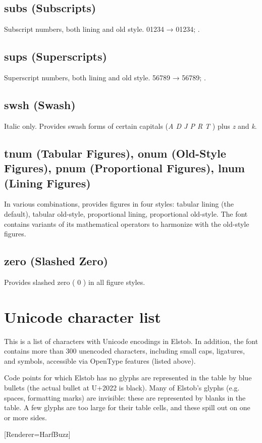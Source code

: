 \documentclass[12pt,letterpaper,openany]{book}
\begin{document}
\section{subs (Subscripts)}
Subscript numbers, both lining and old style. 01234 →
{ 01234};
.

\section{sups (Superscripts)}
Superscript numbers, both lining and old style. 56789 →
{ 56789};
.

\section{swsh (Swash)}
Italic only. Provides swash forms of certain capitals
{(\textit{A D J P R T} ) plus \textit{z} and \textit{k}.}

\section{tnum (Tabular Figures), onum (Old-Style Figures), pnum (Proportional
Figures), lnum (Lining Figures)}
In various combinations, provides figures in four styles:
tabular lining (the default),
tabular old-style,
proportional lining,
proportional old-style. The font contains variants of its mathematical
operators to harmonize with the old-style figures.

\section{zero (Slashed Zero)}
Provides slashed zero ({ 0 }) in all figure styles.

\chapter{Unicode character list}

This is a list of characters with Unicode encodings in Elstob. In addition, the
font contains more than 300 unencoded characters, including small
caps, ligatures, and symbols, accessible via OpenType features (listed above).

Code points for which Elstob has no glyphs are represented in the table by blue
bullets (the actual bullet at U+2022 is black).
Many of Elstob's glyphs (e.g. spaces, formatting marks) are invisible: these
are represented by blanks in the table. A few glyphs are too large for their table cells,
and these spill out on one or more sides.

[Renderer=HarfBuzz]
\end{document}
